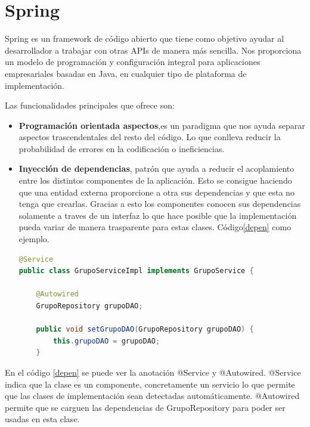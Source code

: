 	
	
\section{Spring}
Spring es un framework \cite{5} de código abierto que tiene como objetivo ayudar al desarrollador a trabajar con otras APIs de manera más sencilla. Nos proporciona un modelo de programación y configuración integral para aplicaciones empresariales basadas en Java, en cualquier tipo de plataforma de implementación. 
	
Las funcionalidades principales que ofrece son:

\begin{itemize}
\item \textbf{Programación orientada aspectos},es un paradigma que nos ayuda separar aspectos trascendentales del resto del código. Lo que conlleva reducir  la probabilidad de errores en la codificación o ineficiencias.


\item\textbf{ Inyección de dependencias}, patrón que ayuda a reducir el acoplamiento entre los distintos componentes de la aplicación. Esto se consigue haciendo que una entidad externa proporcione a otra sus dependencias y que esta no tenga que crearlas.
Gracias a esto los componentes conocen sus dependencias solamente a traves de un interfaz lo que hace posible que la implementación pueda variar de manera trasparente para estas clases. Código\ref{depen} como ejemplo.




 \begin{lstlisting}[language=java,caption={Inyección de dependencias},label=depen]
@Service
public class GrupoServiceImpl implements GrupoService {

	@Autowired
	GrupoRepository grupoDAO;

	public void setGrupoDAO(GrupoRepository grupoDAO) {
		this.grupoDAO = grupoDAO;
	}


\end{lstlisting} 



\end{itemize}

En el código \ref{depen} se puede ver la anotación @Service y @Autowired. @Service indica que la clase es un componente, concretamente un servicio lo que permite que las clases de implementación sean detectadas automáticamente. @Autowired  permite que se carguen las dependencias de GrupoRepository para poder ser usadas en esta clase.
